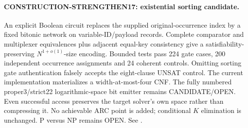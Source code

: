 \paragraph{CONSTRUCTION-STRENGTHEN17: existential sorting candidate.}
An explicit Boolean circuit replaces the supplied original-occurrence
index by a fixed bitonic network on variable-ID/payload records.
Complete comparator and multiplexer equivalences plus adjacent equal-key
consistency give a satisfiability-preserving $N^{1+o(1)}$-size encoding.
Bounded tests pass 224 gate cases, 200 independent occurrence assignments
and 24 coherent controls. Omitting sorting gate authentication falsely
accepts the eight-clause UNSAT control.
The current implementation materializes a width-at-most-four CNF.
The fully numbered proper3/strict22 logarithmic-space bit emitter remains
CANDIDATE/OPEN. Even successful access preserves the target solver's own
space rather than compressing it. No achievable ARC point is added;
conditional $K$ elimination is unchanged. P versus NP remains OPEN.
See .
